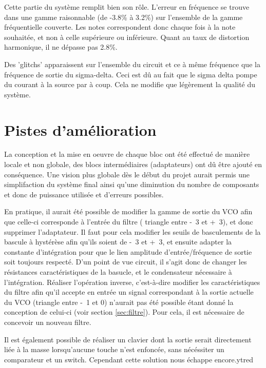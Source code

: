 Cette partie du système remplit bien son rôle. L'erreur en 
fréquence se trouve dans une gamme raisonnable (de -3.8\% à 3.2\%)
sur l'ensemble de la gamme fréquentielle couverte. Les notes 
correspondent donc chaque fois à la note souhaitée, et non à celle
supérieure ou inférieure.
Quant au taux de distortion harmonique, il ne dépasse pas 2.8\%.

Des 'glitchs' apparaissent sur l'ensemble du circuit et ce à 
même fréquence que la fréquence de sortie du sigma-delta. Ceci est dû au fait que
le sigma delta pompe du courant à la source par à coup. Cela ne modifie
que légèrement la qualité du système.

\section{Pistes d'amélioration}
La conception et la mise en oeuvre de chaque bloc ont été effectué
de manière locale et non globale, des blocs
intermédiaires (adaptateurs) ont dû être ajouté en conséquence. Une vision plus
globale dès le début du projet aurait permis une simplifaction du
système final ainsi qu'une diminution du nombre de composants et
donc de puissance utilisée et d'erreurs possibles.

En pratique, il aurait été possible de modifier la gamme de sortie
du VCO afin que celle-ci corresponde à l'entrée du filtre (
triangle entre \unit{-3}{\volt} et \unit{+3}{\volt}), et donc 
supprimer l'adaptateur. Il faut pour cela modifier les seuils
de basculements de la bascule à hystérèse afin qu'ils soient de
\unit{-3}{\volt} et \unit{+3}{\volt}, et ensuite adapter la
constante d'intégration pour que le lien amplitude d'entrée/fréquence
de sortie soit toujours respecté. D'un point de vue circuit, il s'agit
donc de changer les résistances caractéristiques de la basucle, et le
condensateur nécessaire à l'intégration. Réaliser l'opération inverse,
c'est-à-dire modifier les caractéristiques du filtre afin qu'il accepte
en entrée un signal correspondant à la sortie actuelle du VCO 
(triangle entre \unit{-1}{\volt} et \unit{0}{\volt}) n'aurait pas été 
possible étant donné la conception de celui-ci (voir section \ref{sec:filtre}). 
Pour cela, il est nécessaire de concevoir un nouveau filtre.

Il est également possible de réaliser un clavier dont la sortie serait directement
liée à la masse lorsqu'aucune touche n'est enfoncée, sans nécéssiter un comparateur
et un switch. Cependant cette solution nous échappe encore.ytred

